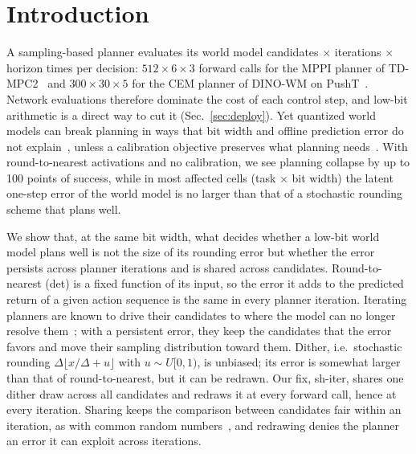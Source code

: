 \documentclass[conference]{IEEEtran}
\newcommand{\dtm}{\textsf{det}\xspace}
\newcommand{\shiter}{\textsf{sh-iter}\xspace}
\begin{document}
\IEEEpeerreviewmaketitle

\section{Introduction}
\label{sec:intro}

A sampling-based planner evaluates its world model candidates $\times$ iterations $\times$ horizon times per decision: $512\times6\times3$ forward calls for the MPPI planner of TD-MPC2~\cite{hansen2024tdmpc2} and $300\times30\times5$ for the CEM planner of DINO-WM on PushT~\cite{zhou2025dinowm}. Network evaluations therefore dominate the cost of each control step, and low-bit arithmetic is a direct way to cut it (Sec.~\ref{sec:deploy}). Yet quantized world models can break planning in ways that bit width and offline prediction error do not explain~\cite{fu2026wmquant, ranganath2026bits, xu2026prede}, unless a calibration objective preserves what planning needs~\cite{anon2026modulemse}. With round-to-nearest activations and no calibration, we see planning collapse by up to 100 points of success, while in most affected cells (task $\times$ bit width) the latent one-step error of the world model is no larger than that of a stochastic rounding scheme that plans well.

We show that, at the same bit width, what decides whether a low-bit world model plans well is not the size of its rounding error but whether the error persists across planner iterations and is shared across candidates. Round-to-nearest (\dtm) is a fixed function of its input, so the error it adds to the predicted return of a given action sequence is the same in every planner iteration. Iterating planners are known to drive their candidates to where the model can no longer resolve them~\cite{anon2026elitecert, anon2026resolution}; with a persistent error, they keep the candidates that the error favors and move their sampling distribution toward them. Dither, i.e.\ stochastic rounding $\Delta\lfloor x/\Delta+u\rfloor$ with $u\sim U[0,1)$, is unbiased; its error is somewhat larger than that of round-to-nearest, but it can be redrawn. Our fix, \shiter, shares one dither draw across all candidates and redraws it at every forward call, hence at every iteration. Sharing keeps the comparison between candidates fair within an iteration, as with common random numbers~\cite{kleinman1999crn}, and redrawing denies the planner an error it can exploit across iterations.
\end{document}
